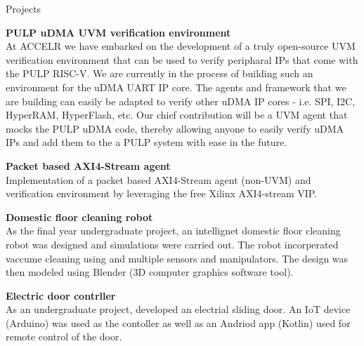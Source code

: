 \documentclass[
	11pt, %
]{resume} %
\begin{document}

\begin{rSection}{Projects}

	\textbf{PULP uDMA UVM verification environment} \\
	At ACCELR we have embarked on the development of a truly open-source UVM verification environment that can be used to verify peripharal IPs that come with the PULP RISC-V. We are currently in the process of building such an environment for the uDMA UART IP core. The agents and framework that we are building can easily be adapted to verify other uDMA IP cores - i.e. SPI, I2C, HyperRAM, HyperFlash, etc. Our chief contribution will be a UVM agent that mocks the PULP uDMA code, thereby allowing anyone to easily verify uDMA IPs and add them to the a PULP system with ease in the future.

	\textbf{Packet based AXI4-Stream agent} \\
	Implementation of a packet based AXI4-Stream agent (non-UVM) and verification environment by leveraging the free Xilinx AXI4-stream VIP.

	\textbf{Domestic floor cleaning robot} \\
	As the final year undergraduate project, an intellignet domestic floor cleaning robot was designed and simulations were carried out. The robot incorperated vaccume cleaning using and multiple sensors and manipulators. The design was then modeled using Blender (3D computer graphics software tool).  

	\textbf{Electric door contrller} \\
	As an undergraduate project, developed an electrial sliding door. An IoT device (Arduino) was used as the contoller as well as an Andriod app (Kotlin) used for remote control of the door.

\end{rSection}




\end{document}
